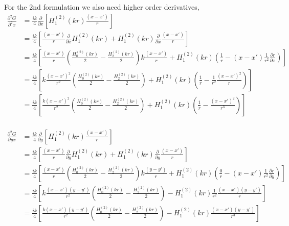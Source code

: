 \documentclass{article}
\newcommand{\0}{\varnothing}
\begin{document}
For the 2nd formulation we also need higher order derivatives,
\begin{align*}
    \frac{\partial^2 G}{\partial^2 x} &= \frac{ik}{4} \frac{\partial }{\partial x} \left[H_{1}^{(2)}(kr) \frac{(x-x')}{r} \right]\\
    &= \frac{ik}{4} \left[ \frac{(x-x')}{r} \frac{\partial }{\partial x} H_{1}^{(2)}(kr)  + 
                        H_{1}^{(2)}(kr) \frac{\partial }{\partial x}  \frac{(x-x')}{r} \right] \\
    &= \frac{ik}{4} \left[ \frac{(x-x')}{r} \left( \frac{H_{0}^{(2)}(kr)}{2} - \frac{H_{2}^{(2)}(kr)}{2} \right) k \frac{(x-x')}{r}  + 
                        H_{1}^{(2)}(kr) \left( \frac{1}{r} - (x-x')\frac{1}{r^2} \frac{\partial r} {\partial x} \right) \right] \\
    &= \frac{ik}{4} \left[ k \frac{(x-x')^2}{r^2} \left( \frac{H_{0}^{(2)}(kr)}{2} - \frac{H_{2}^{(2)}(kr)}{2} \right)  + H_{1}^{(2)}(kr) \left( \frac{1}{r} - \frac{1}{r^2} \frac{(x-x')^2}{r} \right) \right] \\
    &= \frac{ik}{4} \left[ \frac{k(x-x')^2}{r^2} \left( \frac{H_{0}^{(2)}(kr)}{2} - \frac{H_{2}^{(2)}(kr)}{2} \right) + 
        H_{1}^{(2)}(kr)\left(\frac{1}{r} - \frac{(x-x')^2}{r^3} \right)  \right] \\
\end{align*}

\begin{align*}
    \frac{\partial^2 G}{\partial yx} &= \frac{ik}{4} \frac{\partial }{\partial y} \left[H_{1}^{(2)}(kr) \frac{(x-x')}{r} \right]\\
    &= \frac{ik}{4} \left[ \frac{(x-x')}{r} \frac{\partial }{\partial y} H_{1}^{(2)}(kr)  + 
                        H_{1}^{(2)}(kr) \frac{\partial }{\partial y}  \frac{(x-x')}{r} \right] \\
    &= \frac{ik}{4} \left[ \frac{(x-x')}{r} \left( \frac{H_{0}^{(2)}(kr)}{2} - \frac{H_{2}^{(2)}(kr)}{2} \right) k \frac{(y-y')}{r}  + 
                        H_{1}^{(2)}(kr) \left( \frac{0}{r} - (x-x')\frac{1}{r^2} \frac{\partial r} {\partial y} \right) \right] \\
    &= \frac{ik}{4} \left[ k \frac{(x-x')(y-y')}{r^2} \left( \frac{H_{0}^{(2)}(kr)}{2} - \frac{H_{2}^{(2)}(kr)}{2} \right)  - H_{1}^{(2)}(kr) \frac{1}{r^2} \frac{(x-x')(y-y')}{r}  \right] \\
    &= \frac{ik}{4} \left[ \frac{k(x-x')(y-y')}{r^2} \left( \frac{H_{0}^{(2)}(kr)}{2} - \frac{H_{2}^{(2)}(kr)}{2} \right) -
        H_{1}^{(2)}(kr)\frac{(x-x')(y-y')}{r^3}  \right] \\
\end{align*}
\end{document}
